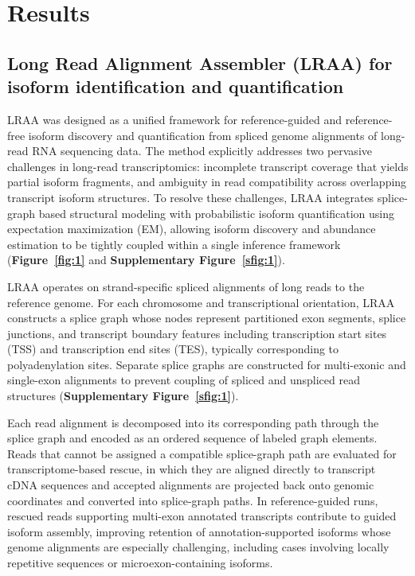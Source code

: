 \section{Results}\label{results}

\subsection{Long Read Alignment Assembler (LRAA) for isoform identification and quantification}\label{long-read-alignment-assembler-lraa-for-isoform-identification-and-quantification}

LRAA was designed as a unified framework for reference-guided and reference-free isoform discovery and quantification from spliced genome alignments of long-read RNA sequencing data. The method explicitly addresses two pervasive challenges in long-read transcriptomics: incomplete transcript coverage that yields partial isoform fragments, and ambiguity in read compatibility across overlapping transcript isoform structures. To resolve these challenges, LRAA integrates splice-graph based structural modeling with probabilistic isoform quantification using expectation maximization (EM), allowing isoform discovery and abundance estimation to be tightly coupled within a single inference framework (\textbf{Figure~\ref{fig:1}} and \textbf{Supplementary Figure~\ref{sfig:1}}).

LRAA operates on strand-specific spliced alignments of long reads to the reference genome. For each chromosome and transcriptional orientation, LRAA constructs a splice graph whose nodes represent partitioned exon segments, splice junctions, and transcript boundary features including transcription start sites (TSS) and transcription end sites (TES), typically corresponding to polyadenylation sites. Separate splice graphs are constructed for multi-exonic and single-exon alignments to prevent coupling of spliced and unspliced read structures (\textbf{Supplementary Figure~\ref{sfig:1}}).

Each read alignment is decomposed into its corresponding path through the splice graph and encoded as an ordered sequence of labeled graph elements. Reads that cannot be assigned a compatible splice-graph path are evaluated for transcriptome-based rescue, in which they are aligned directly to transcript cDNA sequences and accepted alignments are projected back onto genomic coordinates and converted into splice-graph paths. In reference-guided runs, rescued reads supporting multi-exon annotated transcripts contribute to guided isoform assembly, improving retention of annotation-supported isoforms whose genome alignments are especially challenging, including cases involving locally repetitive sequences or microexon-containing isoforms.


